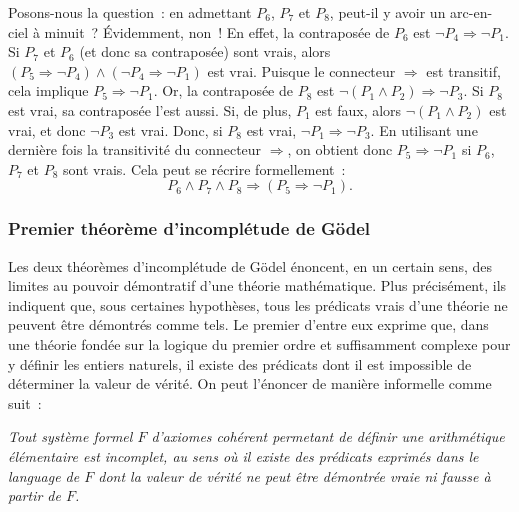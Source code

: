 Posons-nous la question : en admettant $P_6$, $P_7$ et $P_8$, peut-il y avoir un arc-en-ciel à minuit ? 
Évidemment, non ! 
En effet, la contraposée de $P_6$ est $\neg  P_4 \Rightarrow \neg P_1$. 
Si $P_7$ et $P_6$ (et donc sa contraposée) sont vrais, alors $(P_5 \Rightarrow \neg P_4) \wedge (\neg  P_4 \Rightarrow \neg P_1)$ est vrai. 
Puisque le connecteur $\Rightarrow$ est transitif, cela implique $P_5 \Rightarrow \neg P_1$. 
Or, la contraposée de $P_8$ est $\neg (P_1 \wedge P_2) \Rightarrow \neg P_3$. 
Si $P_8$ est vrai, sa contraposée l'est aussi. 
Si, de plus, $P_1$ est faux, alors $\neg (P_1 \wedge P_2)$ est vrai, et donc $\neg P_3$ est vrai. 
Donc, si $P_8$ est vrai, $\neg P_1 \Rightarrow \neg P_3$. 
En utilisant une dernière fois la transitivité du connecteur $\Rightarrow$, on obtient donc $P_5 \Rightarrow \neg P_1$ si $P_6$, $P_7$ et $P_8$ sont vrais. 
Cela peut se récrire formellement : 
\begin{equation*}
    P_6 \wedge P_7 \wedge P_8 \Rightarrow (P_5 \Rightarrow \neg P_1). 
\end{equation*}

\subsubsection{Premier théorème d'incomplétude de Gödel}

Les deux théorèmes d'incomplétude de Gödel énoncent, en un certain sens, des limites au pouvoir démontratif d'une théorie mathématique. 
Plus précisément, ils indiquent que, sous certaines hypothèses, tous les prédicats vrais d'une théorie ne peuvent être démontrés comme tels. 
Le premier d'entre eux exprime que, dans une théorie fondée sur la logique du premier ordre et suffisamment complexe pour y définir les entiers naturels, il existe des prédicats dont il est impossible de déterminer la valeur de vérité.
On peut l'énoncer de manière informelle comme suit : 

\medskip

\noindent \textit{Tout système formel $F$ d'axiomes cohérent permetant de définir une arithmétique élémentaire est incomplet, au sens où il existe des prédicats exprimés dans le language de $F$ dont la valeur de vérité ne peut être démontrée vraie ni fausse à partir de $F$.}

\medskip

